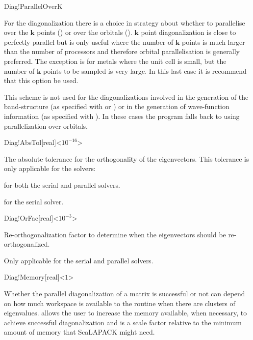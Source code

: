 \begin{fdflogicalF}{Diag!ParallelOverK}
  
  For the diagonalization there is a choice in strategy about whether
  to parallelise over the $\mathbf k$ points (\fdftrue) or over the
  orbitals (\fdffalse). $\mathbf k$ point diagonalization is close to
  perfectly parallel but is only useful where the number of
  $\mathbf k$ points is much larger than the number of processors and
  therefore orbital parallelisation is generally preferred. The
  exception is for metals where the unit cell is small, but the number
  of $\mathbf k$ points to be sampled is very large. In this last case
  it is recommend that this option be used.

  \note This scheme is not used for the diagonalizations involved in
  the generation of the band-structure (as specified with
   or ) or in the generation of
  wave-function information (as specified with
  ). In these cases the program falls back to
  using parallelization over orbitals.

\end{fdflogicalF}

\begin{fdfentry}{Diag!AbsTol}[real]<$10^{-16}$>

  The absolute tolerance for the orthogonality of the eigenvectors.
  This tolerance is only applicable for the solvers:

   for both the serial and parallel solvers.

   for the serial solver.
  
\end{fdfentry}

\begin{fdfentry}{Diag!OrFac}[real]<$10^{-3}$>

  Re-orthogonalization factor to determine when the eigenvectors
  should be re-orthogonalized. 

  Only applicable for the  serial and parallel solvers.
  
\end{fdfentry}


\begin{fdfentry}{Diag!Memory}[real]<$1$>
  
  Whether the parallel diagonalization of a matrix is successful or
  not can depend on how much workspace is available to the routine
  when there are clusters of eigenvalues.  allows
  the user to increase the memory available, when necessary, to
  achieve successful diagonalization and is a scale factor relative to
  the minimum amount of memory that ScaLAPACK might need.

\end{fdfentry}


